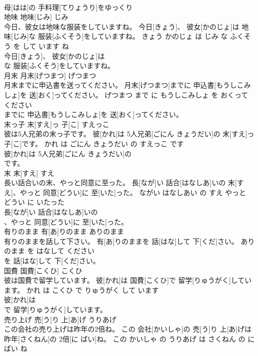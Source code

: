 \documentclass[8pt]{extreport}
\begin{document}
\begin{CJK}{UTF8}{min}
\\	母[はは]の 手料理[てりょうり]をゆっくり
\\	地味	地味[じみ]	じみ	
\\	今日、彼女は地味な服装をしていますね。	今日[きょう]、 彼女[かのじょ]は 地味[じみ]な 服装[ふくそう]をしていますね。	きょう かのじょ は じみ な ふくそう を して います ね	
\\	今日[きょう]、 彼女[かのじょ]は
\\	な 服装[ふくそう]をしていますね。			
\\	月末	月末[げつまつ]	げつまつ	
\\	月末までに申込書を送ってください。	月末[げつまつ]までに 申込書[もうしこみしょ]を 送[おく]ってください。	げつまつ まで に もうしこみしょ を おくって ください	
\\	までに 申込書[もうしこみしょ]を 送[おく]ってください。			
\\	末っ子	末[すえ]っ 子[こ]	すえっこ	
\\	彼は5人兄弟の末っ子です。	彼[かれ]は 5人兄弟[ごにん きょうだい]の 末[すえ]っ 子[こ]です。	かれ は ごにん きょうだい の すえっこ です	
\\	彼[かれ]は 5人兄弟[ごにん きょうだい]の
\\	です。			
\\	末	末[すえ]	すえ	
\\	長い話合いの末、やっと同意に至った。	長[なが]い 話合[はなしあ]いの 末[すえ]、やっと 同意[どうい]に 至[いた]った。	ながい はなしあい の すえ やっと どうい に いたった	
\\	長[なが]い 話合[はなしあ]いの
\\	、やっと 同意[どうい]に 至[いた]った。			
\\	有りのまま	有[あ]りのまま	ありのまま	
\\	有りのままを話して下さい。	有[あ]りのままを 話[はな]して 下[くだ]さい。	ありのまま を はなして ください	
\\	を 話[はな]して 下[くだ]さい。			
\\	国費	国費[こくひ]	こくひ	
\\	彼は国費で留学しています。	彼[かれ]は 国費[こくひ]で 留学[りゅうがく]しています。	かれ は こくひ で りゅうがく して います	
\\	彼[かれ]は
\\	で 留学[りゅうがく]しています。			
\\	売り上げ	売[う]り 上[あ]げ	うりあげ	
\\	この会社の売り上げは昨年の2倍ね。	この 会社[かいしゃ]の 売[う]り 上[あ]げは 昨年[さくねん]の 2倍[に ばい]ね。	この かいしゃ の うりあげ は さくねん の に ばい ね	

\end{CJK}
\end{document}
